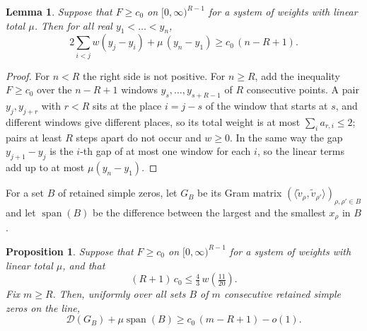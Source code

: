 \documentclass[aps,prd,twocolumn,superscriptaddress,nofootinbib,longbibliography,floatfix,showkeys,amsmath,amssymb,10pt]{revtex4-2}
\newtheorem{lemma}[theorem]{Lemma}
\newtheorem{proposition}[theorem]{Proposition}
\theoremstyle{definition}
\theoremstyle{remark}
\newcommand{\cD}{\mathcal{D}}
\DeclareMathOperator{\spanop}{span}
\begin{document}
\begin{lemma}\label{lem:windows}
Suppose that $F\ge c_0$ on $[0,\infty)^{R-1}$ for a system of weights with
linear total $\mu$. Then for all real $y_1<\dots<y_n$,
\[
 2\sum_{i<j}w(y_j-y_i)+\mu\,(y_n-y_1)\ge c_0\,(n-R+1).
\]
\end{lemma}

\begin{proof}
For $n<R$ the right side is not positive. For $n\ge R$, add the inequality
$F\ge c_0$ over the $n-R+1$ windows $y_s,\dots,y_{s+R-1}$ of $R$
consecutive points. A pair $y_j,y_{j+r}$ with $r<R$ sits at the place
$i=j-s$ of the window that starts at $s$, and different windows give
different places, so its total weight is at most $\sum_ia_{r,i}\le2$;
pairs at least $R$ steps apart do not occur and $w\ge0$. In the same way
the gap $y_{j+1}-y_j$ is the $i$-th gap of at most one window for each $i$,
so the linear terms add up to at most $\mu(y_n-y_1)$.
\end{proof}

For a set $B$ of retained simple zeros, let $G_B$ be its Gram matrix
$(\langle\tilde v_\rho,\tilde v_{\rho'}\rangle)_{\rho,\rho'\in B}$ and let
$\spanop(B)$ be the difference between the largest and the smallest
$x_\rho$ in $B$.

\begin{proposition}\label{prop:block}
Suppose that $F\ge c_0$ on $[0,\infty)^{R-1}$ for a system of weights with
linear total $\mu$, and that
\begin{equation}\label{eq:c0cond}
 (R+1)\,c_0\le\tfrac43\,w(\tfrac{11}{20}).
\end{equation}
Fix $m\ge R$. Then, uniformly over all sets $B$ of
$m$ consecutive retained simple zeros on the line,
\[
 \cD(G_B)+\mu\spanop(B)\ge c_0\,(m-R+1)-o(1).
\]
\end{proposition}
\end{document}
